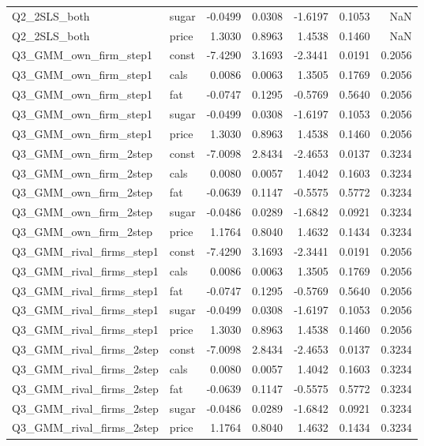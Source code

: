 \begin{longtable}{llrrrrr}
Q2_2SLS_both & sugar & -0.0499 & 0.0308 & -1.6197 & 0.1053 & NaN \\
Q2_2SLS_both & price & 1.3030 & 0.8963 & 1.4538 & 0.1460 & NaN \\
Q3_GMM_own_firm_step1 & const & -7.4290 & 3.1693 & -2.3441 & 0.0191 & 0.2056 \\
Q3_GMM_own_firm_step1 & cals & 0.0086 & 0.0063 & 1.3505 & 0.1769 & 0.2056 \\
Q3_GMM_own_firm_step1 & fat & -0.0747 & 0.1295 & -0.5769 & 0.5640 & 0.2056 \\
Q3_GMM_own_firm_step1 & sugar & -0.0499 & 0.0308 & -1.6197 & 0.1053 & 0.2056 \\
Q3_GMM_own_firm_step1 & price & 1.3030 & 0.8963 & 1.4538 & 0.1460 & 0.2056 \\
Q3_GMM_own_firm_2step & const & -7.0098 & 2.8434 & -2.4653 & 0.0137 & 0.3234 \\
Q3_GMM_own_firm_2step & cals & 0.0080 & 0.0057 & 1.4042 & 0.1603 & 0.3234 \\
Q3_GMM_own_firm_2step & fat & -0.0639 & 0.1147 & -0.5575 & 0.5772 & 0.3234 \\
Q3_GMM_own_firm_2step & sugar & -0.0486 & 0.0289 & -1.6842 & 0.0921 & 0.3234 \\
Q3_GMM_own_firm_2step & price & 1.1764 & 0.8040 & 1.4632 & 0.1434 & 0.3234 \\
Q3_GMM_rival_firms_step1 & const & -7.4290 & 3.1693 & -2.3441 & 0.0191 & 0.2056 \\
Q3_GMM_rival_firms_step1 & cals & 0.0086 & 0.0063 & 1.3505 & 0.1769 & 0.2056 \\
Q3_GMM_rival_firms_step1 & fat & -0.0747 & 0.1295 & -0.5769 & 0.5640 & 0.2056 \\
Q3_GMM_rival_firms_step1 & sugar & -0.0499 & 0.0308 & -1.6197 & 0.1053 & 0.2056 \\
Q3_GMM_rival_firms_step1 & price & 1.3030 & 0.8963 & 1.4538 & 0.1460 & 0.2056 \\
Q3_GMM_rival_firms_2step & const & -7.0098 & 2.8434 & -2.4653 & 0.0137 & 0.3234 \\
Q3_GMM_rival_firms_2step & cals & 0.0080 & 0.0057 & 1.4042 & 0.1603 & 0.3234 \\
Q3_GMM_rival_firms_2step & fat & -0.0639 & 0.1147 & -0.5575 & 0.5772 & 0.3234 \\
Q3_GMM_rival_firms_2step & sugar & -0.0486 & 0.0289 & -1.6842 & 0.0921 & 0.3234 \\
Q3_GMM_rival_firms_2step & price & 1.1764 & 0.8040 & 1.4632 & 0.1434 & 0.3234 \\

\end{longtable}
